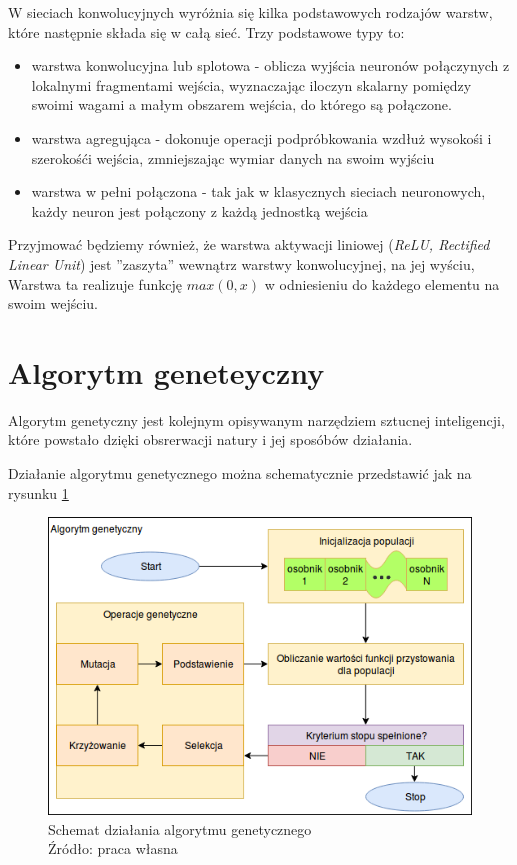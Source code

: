 W sieciach konwolucyjnych wyróżnia się kilka podstawowych rodzajów warstw, które następnie składa się w całą sieć.
Trzy podstawowe typy to:
\begin{itemize}
	\item warstwa konwolucyjna lub splotowa - oblicza wyjścia neuronów połączynych z lokalnymi fragmentami wejścia, wyznaczając iloczyn skalarny pomiędzy swoimi wagami a małym obszarem wejścia, do którego są połączone.
	\item warstwa agregująca - dokonuje operacji podpróbkowania wzdłuż wysokośi i szerokośći wejścia, zmniejszając wymiar danych na swoim wyjściu
	\item warstwa w pełni połączona - tak jak w klasycznych sieciach neuronowych, każdy neuron jest połączony z każdą jednostką wejścia
\end{itemize}

Przyjmować będziemy również, że warstwa aktywacji liniowej (\textit{ReLU, Rectified Linear Unit}) jest ''zaszyta'' wewnątrz warstwy konwolucyjnej, na jej wyściu,
Warstwa ta realizuje funkcję $max(0, x)$ w odniesieniu do każdego elementu na swoim wejściu. \cite{cs231n}

\section{Algorytm geneteyczny}\label{sec:ag}

Algorytm genetyczny jest kolejnym opisywanym narzędziem sztucnej inteligencji, które powstało dzięki obsrerwacji natury i jej sposóbów działania.

Działanie algorytmu genetycznego można schematycznie przedstawić jak na rysunku \ref{fig:gen_schemat}

\begin{figure}[h!tb]
	 \centering
	 \includegraphics[width = 1.0\linewidth]{img/genetyczny_schemat}
	 \caption{Schemat działania algorytmu genetycznego \\
              Źródło: praca własna}
	 \label{fig:gen_schemat}
\end{figure}
